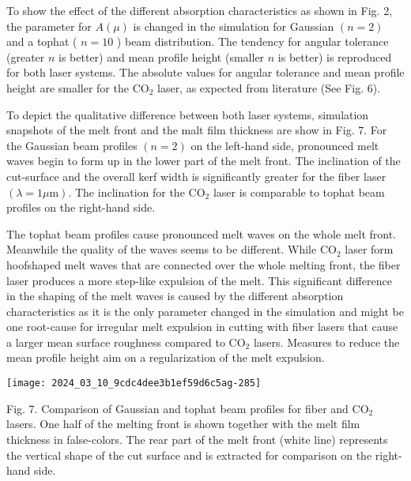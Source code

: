 \documentclass[10pt]{article}
\begin{document}
To show the effect of the different absorption characteristics as shown in Fig. 2, the parameter for $A(\mu)$ is changed in the simulation for Gaussian $(n=2)$ and a tophat ( $n=10$ ) beam distribution. The tendency for angular tolerance (greater $n$ is better) and mean profile height (smaller $n$ is better) is reproduced for both laser systems. The absolute values for angular tolerance and mean profile height are smaller for the $\mathrm{CO}_{2}$ laser, as expected from literature (See Fig. 6).

To depict the qualitative difference between both laser systems, simulation snapshots of the melt front and the malt film thickness are show in Fig. 7. For the Gaussian beam profiles $(n=2)$ on the left-hand side, pronounced melt waves begin to form up in the lower part of the melt front. The inclination of the cut-surface and the overall kerf width is significantly greater for the fiber laser $(\lambda=1 \mu \mathrm{m})$. The inclination for the $\mathrm{CO}_{2}$ laser is comparable to tophat beam profiles on the right-hand side.

The tophat beam profiles cause pronounced melt waves on the whole melt front. Meanwhile the quality of the waves seems to be different. While $\mathrm{CO}_{2}$ laser form hoofshaped melt waves that are connected over the whole melting front, the fiber laser produces a more step-like expulsion of the melt. This significant difference in the shaping of the melt waves is caused by the different absorption characteristics as it is the only parameter changed in the simulation and might be one root-cause for irregular melt expulsion in cutting with fiber lasers that cause a larger mean surface roughness compared to $\mathrm{CO}_{2}$ lasers. Measures to reduce the mean profile height aim on a regularization of the melt expulsion.

\begin{center}
\texttt{[image: 2024\_03\_10\_9cdc4dee3b1ef59d6c5ag-285]}
\end{center}

Fig. 7. Comparison of Gaussian and tophat beam profiles for fiber and $\mathrm{CO}_{2}$ lasers. One half of the melting front is shown together with the melt film thickness in false-colors. The rear part of the melt front (white line) represents the vertical shape of the cut surface and is extracted for comparison on the right-hand side.
\end{document}
